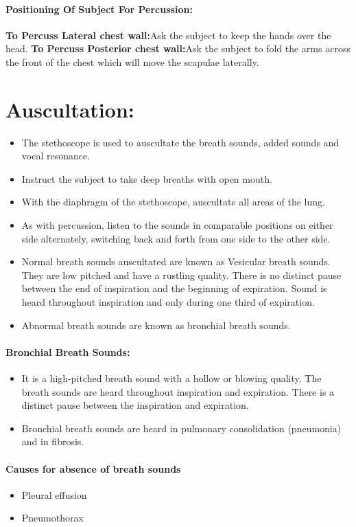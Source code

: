 \documentclass[a4paper,12pt,openany,twoside]{book}
\begin{document}
\paragraph{Positioning Of Subject For Percussion:}
\textbf{To Percuss Lateral chest wall:}Ask the subject to keep the hands over the head.
\textbf{To Percuss Posterior chest wall:}Ask the subject to fold the arms across the front of the chest which will move the scapulae laterally.

\section*{Auscultation:}
\begin{itemize}
\item{The  stethoscope  is  used  to  auscultate  the  breath  sounds,  added  sounds  and  vocal resonance.}
\item{Instruct the subject to take deep breaths with open mouth.}
\item{With the diaphragm of the stethoscope, auscultate all areas of the lung.}
\item{As with percussion, listen to the sounds in comparable positions on either side alternately, switching back and forth from one side to the other side.}
\item{Normal breath sounds auscultated are known as Vesicular breath sounds. They are low pitched and have a rustling quality. There is no distinct pause between the end of inspiration and the beginning of expiration. Sound is heard throughout inspiration and only during one third of expiration.}
\item{Abnormal breath sounds are known as bronchial breath sounds.}
\end{itemize}

\paragraph{Bronchial Breath Sounds:}
\begin{itemize}
\item{It is a high-pitched breath sound with a hollow or blowing quality. The breath sounds are heard throughout inspiration and expiration. There is a distinct pause between the inspiration and expiration.}
\item{Bronchial breath sounds are heard in pulmonary consolidation (pneumonia) and in fibrosis.}
\end{itemize}

\paragraph{Causes for absence of breath sounds}
\begin{itemize}
		\itemsep0em
	\item{Pleural effusion}
	\item{Pneumothorax}
\end{itemize}
\end{document}
